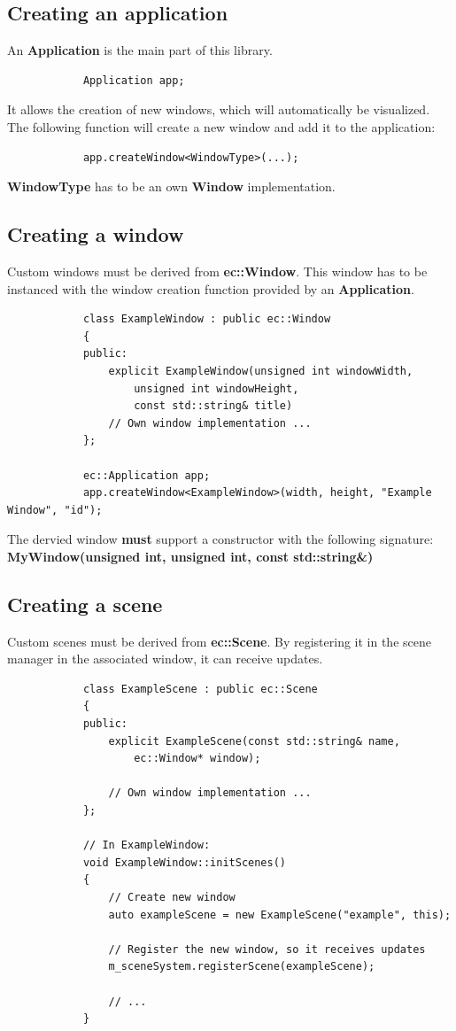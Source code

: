 \documentclass[12p, paper=a4, leqno, colorinlistoftodos]{article}
\begin{document}
		\subsection{Creating an application}
		An \textbf{Application} is the main part of this library.
		\begin{lstlisting}
			Application app;
		\end{lstlisting}
		It allows the creation of new windows, which will automatically be visualized. The following function will create a new window and add it to the application:
		\begin{lstlisting}
			app.createWindow<WindowType>(...);
		\end{lstlisting}
		\textbf{WindowType} has to be an own \textbf{Window} implementation.
		
		\subsection{Creating a window}
		Custom windows must be derived from \textbf{ec::Window}. This window has to be instanced with the window creation function provided by an \textbf{Application}. 	
		\begin{lstlisting}
			class ExampleWindow : public ec::Window
			{
			public:
				explicit ExampleWindow(unsigned int windowWidth,
					unsigned int windowHeight,
					const std::string& title)
				// Own window implementation ...
			};
		
			ec::Application app;
			app.createWindow<ExampleWindow>(width, height, "Example Window", "id");
		\end{lstlisting}
		
		The dervied window  \textbf{must} support a constructor with the following signature:\\
		\textbf{MyWindow(unsigned int, unsigned int, const std::string\&)}
		
		
		
		\subsection{Creating a scene}
		Custom scenes must be derived from \textbf{ec::Scene}. By registering it in the scene manager in the associated window, it can receive updates.	
		
		\begin{lstlisting}
			class ExampleScene : public ec::Scene
			{
			public:
				explicit ExampleScene(const std::string& name, 
					ec::Window* window);
			
				// Own window implementation ...
			};
			
			// In ExampleWindow:
			void ExampleWindow::initScenes()
			{
				// Create new window
				auto exampleScene = new ExampleScene("example", this);
				
				// Register the new window, so it receives updates
				m_sceneSystem.registerScene(exampleScene);
			
				// ...
			}
		\end{lstlisting}
		
\end{document}
